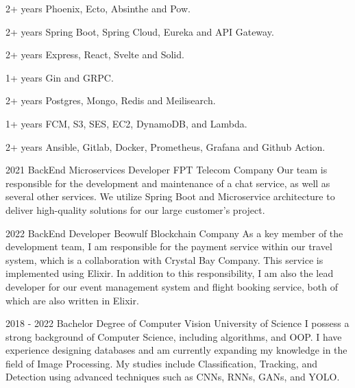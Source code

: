 \documentclass[10pt,A4]{article}
\begin{document}
\begin{paracol}{2}
\begin{leftcolumn}
 {2+ years} {Phoenix, Ecto, Absinthe and Pow.}

 {2+ years} {Spring Boot, Spring Cloud, Eureka and API Gateway.}

 {2+ years} {Express, React, Svelte and Solid.}

 {1+ years} {Gin and GRPC.}

 {2+ years} {Postgres, Mongo, Redis and Meilisearch.}

 {1+ years} {FCM, S3, SES, EC2, DynamoDB, and Lambda.}

 {2+ years} {Ansible, Gitlab, Docker, Prometheus, Grafana and Github Action.}

\end{leftcolumn}
\begin{rightcolumn}

    
\cvevent
    {2021}
    {BackEnd Microservices Developer}
    {FPT Telecom Company}
    {Our team is responsible for the development and maintenance of a chat service, as well as several other services. We utilize Spring Boot and Microservice architecture to deliver high-quality solutions for our large customer’s project.}
    
\cvevent
    {2022}
    {BackEnd Developer}
    {Beowulf Blockchain Company}
    {As a key member of the development team, I am responsible for the payment service within our travel system, which is a collaboration with Crystal Bay Company. This service is implemented using Elixir. In addition to this responsibility, I am also the lead developer for our event management system and flight booking service, both of which are also written in Elixir.}

{}

\cvevent
	{2018 - 2022}
	{Bachelor Degree of Computer Vision}
	{University of Science}
	{I possess a strong background of Computer Science, including algorithms, and OOP. I have experience designing databases and am currently expanding my knowledge in the field of Image Processing. My studies include Classification, Tracking, and Detection using advanced techniques such as CNNs, RNNs, GANs, and YOLO.}


\end{rightcolumn}
\end{paracol}
\end{document}
